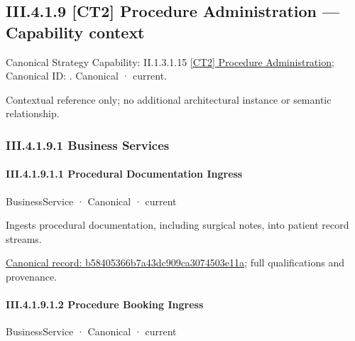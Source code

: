 \subsection*{III.4.1.9 [CT2] Procedure Administration — Capability context}
\label{navigation:III.4.1.9}

{\small Canonical Strategy Capability: II.1.3.1.15 \hyperref[element:649dd7cc26094e539386a050086dfb91]{[CT2] Procedure Administration}; Canonical ID: \texttt{}. Canonical · current.}\par
Contextual reference only; no additional architectural instance or semantic relationship.\par
\subsubsection*{III.4.1.9.1 Business Services}
\label{navigation:III.4.1.9.1}

\paragraph*{III.4.1.9.1.1 Procedural Documentation Ingress}
\label{navigation:III.4.1.9.1.1}

\label{element:b58405366b7a43dc909ca3074503e11a}
{\small BusinessService · Canonical · current}\par

Ingests procedural documentation, including surgical notes, into patient record streams.


{\footnotesize \href{../../../../continuum/business/business-service/b58405366b7a43dc909ca3074503e11a.md}{Canonical record: b58405366b7a43dc909ca3074503e11a}; full qualifications and provenance.}\par
\paragraph*{III.4.1.9.1.2 Procedure Booking Ingress}
\label{navigation:III.4.1.9.1.2}

\label{element:64c52e8e6f304dee8d86a5da96f927e3}
{\small BusinessService · Canonical · current}\par

